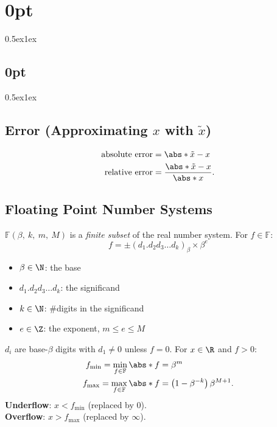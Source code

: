 \documentclass{article}
\begin{document}
\titlespacing*\section{0pt}{0.5ex}{1ex}
\titlespacing*\subsection{0pt}{0.5ex}{1ex}
%
\setlength\abovecaptionskip{8pt}
\setlength\belowcaptionskip{-15pt}
\setlength\textfloatsep{0pt}
%
\setlength\abovedisplayskip{1pt}
\setlength\belowdisplayskip{1pt}

\begin{multicols}{3}
    \subsection{Error (Approximating \texorpdfstring{\(x\)}{x} with \texorpdfstring{\(\tilde{x}\)}{tilde-x})}
    \begin{align*}
        \text{absolute error} & = \abs*{\tilde{x}-x}                   \\
        \text{relative error} & = \frac{\abs*{\tilde{x}-x}}{\abs*{x}}.
    \end{align*}
    \subsection{Floating Point Number Systems}
    \(\mathbb{F}\left( \beta,\: k,\: m,\: M \right)\)
    is a \textit{finite subset} of the real number system. For \(f \in \mathbb{F}\):
    \begin{equation*}
        f = \pm \left( d_1.d_2 d_3 \dots d_k \right)_\beta \times \beta^e
    \end{equation*}
    \begin{itemize}
        \item \(\beta \in \N\): the base
        \item \(d_1.d_2 d_3 \dots d_k\): the significand
        \item \(k \in \N\): \#digits in the significand
        \item \(e \in \Z\): the exponent, \(m \leq e \leq M\)
    \end{itemize}
    \(d_i\) are base-\(\beta\) digits with \(d_1 \neq 0\) unless \(f = 0\).
    For \(x \in \R\) and \(f > 0\):
    \begin{align*}
        f_\mathrm{min} = \min_{f \in \mathbb{F}} \abs*{f} & = \beta^m                                      \\
        f_\mathrm{max} = \max_{f \in \mathbb{F}} \abs*{f} & = \left( 1 - \beta^{-k} \right) \beta^{M + 1}.
    \end{align*}
    \textbf{Underflow}: \(x < f_\mathrm{min}\) (replaced by \(0\)). \\
    \textbf{Overflow}: \(x > f_\mathrm{max}\) (replaced by \(\infty\)).


\end{multicols}
\end{document}
